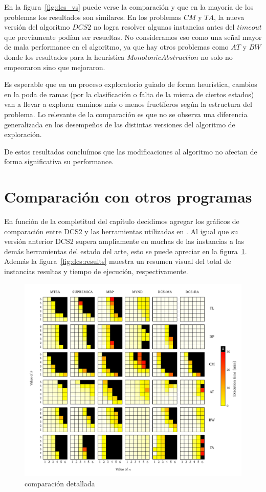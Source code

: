 En la figura~\ref{fig:dcs_vs} puede verse la comparación y que en la mayoría de los problemas los resultados son similares. En los problemas $CM$ y $TA$, la nueva versión del algoritmo $DCS2$ no logra resolver algunas instancias antes del $timeout$ que previamente podían ser resueltas. No consideramos eso como una señal mayor de mala performance en el algoritmo, ya que hay otros problemas como $AT$ y $BW$ donde los resultados para la heurística $Monotonic Abstraction$ no solo no empeoraron sino que mejoraron.

Es esperable que en un proceso exploratorio guiado de forma heurística, cambios en la poda de ramas (por la clasificación o falta de la misma de ciertos estados) van a llevar a explorar caminos más o menos fructíferos según la estructura del problema. Lo relevante de la comparación es que no se observa una diferencia generalizada en los desempeños de las distintas versiones del algoritmo de exploración.

De estos resultados concluímos que las modificaciones al algoritmo no afectan de forma significativa su performance.

\section{Comparación con otros programas}

En función de la completitud del capítulo decidimos agregar los gráficos de comparación entre DCS2 y las herramientas utilizadas en \cite{tesisDani}. Al igual que su versión anterior DCS2 supera ampliamente en muchas de las instancias a las demás herramientas del estado del arte, esto se puede apreciar en la figura~\ref{fig:vs_otros}. Además la figura~\ref{fig:dcs:results} muestra un resumen visual del total de instancias resultas y tiempo de ejecución, respectivamente.


\begin{figure}[htb]
	\centering
	\includegraphics[width=\linewidth]{figures/nuestrosResults/detailed.pdf}  
	\caption{comparación detallada}
	\label{fig:vs_otros}
\end{figure}

